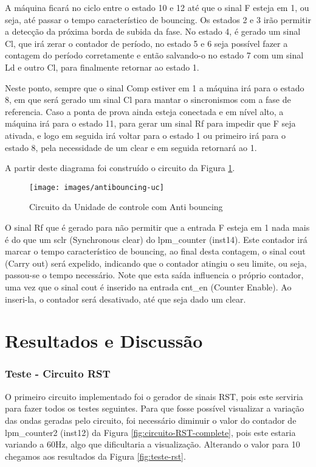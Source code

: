 \documentclass[12pt,a4paper,openany]{abntex2}
\begin{document}
A máquina ficará no ciclo entre o estado 10 e 12 até que o sinal F esteja em 1, ou seja, até passar o tempo característico de bouncing. Os estados 2 e 3 irão permitir a detecção da próxima borda de subida da fase. No estado 4, é gerado um sinal Cl, que irá zerar o contador de período, no estado 5 e 6 seja possível fazer a contagem do período corretamente e então salvando-o no estado 7 com um sinal Ld e outro Cl, para finalmente retornar ao estado 1.

Neste ponto, sempre que o sinal Comp estiver em 1 a máquina irá para o estado 8, em que será gerado um sinal Cl para mantar o sincronismos com a fase de referencia. Caso a ponta de prova ainda esteja conectada e em nível alto, a máquina irá para o estado 11, para gerar um sinal Rf para impedir que F seja ativada, e logo em seguida irá voltar para o estado 1 ou primeiro irá para o estado 8, pela necessidade de um clear e em seguida retornará ao 1.

A partir deste diagrama foi construído o circuito da Figura \ref{fig:antibouncing-uc}.

\begin{figure}[!htp]
	\centering
	\caption{Circuito da Unidade de controle com Anti bouncing}
	\texttt{[image: images/antibouncing-uc]}	\label{fig:antibouncing-uc}
\end{figure}

O sinal Rf que é gerado para não permitir que a entrada F esteja em 1 nada mais é do que um sclr (Synchronous clear) do lpm\_counter (inst14). Este contador irá marcar o tempo característico de bouncing, ao final desta contagem, o sinal cout (Carry out) será expelido, indicando que o contador atingiu o seu limite, ou seja, passou-se o tempo necessário. Note que esta saída influencia o próprio contador, uma vez que o sinal cout é inserido na entrada cnt\_en (Counter Enable). Ao inseri-la, o contador será desativado, até que seja dado um clear.

\chapter{Resultados e Discussão}

\subsection{Teste - Circuito RST}

O primeiro circuito implementado foi o gerador de sinais RST, pois este serviria para fazer todos os testes seguintes. Para que fosse possível visualizar a variação das ondas geradas pelo circuito, foi necessário diminuir o valor do contador de lpm\_counter2 (inst12) da Figura \ref{fig:circuito-RST-complete}, pois este estaria variando a 60Hz, algo que dificultaria a visualização. Alterando o valor para 10 chegamos aos resultados da Figura \ref{fig:teste-rst}.
\end{document}

